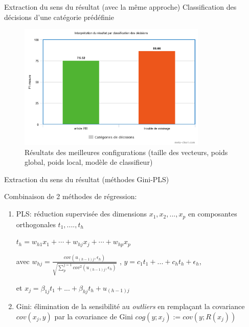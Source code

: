 \documentclass[newPxFont,pagenumber]{beamer}
\begin{document}
\begin{frame}{Extraction du sens du résultat (avec la même approche)}
Classification des décisions d'une catégorie prédéfinie
\begin{figure}
\includegraphics[width=0.8\textwidth]{classifResultat.png}
\caption{Résultats des meilleures configurations (taille des vecteurs, poids global, poids local, modèle de classifieur)}
\end{figure}
\end{frame}

\begin{frame}{Extraction du sens du résultat (méthodes Gini-PLS)}

Combinaison de 2 méthodes de régression:
\begin{enumerate}
\setlength\itemsep{1.5em}
\item PLS: réduction supervisée des dimensions $x_1, x_2, ..., x_p$ en composantes orthogonales $t_1, ...., t_h$

$t_h = w_{h1} x_1 + \cdots + w_{hj} x_j + \cdots + w_{hp} x_p$

avec $w_{hj} = \frac{cov(u_{(h-1)j}, \epsilon_h)}{\sqrt{\sum_p^{j=1} cov^2(u_{(h-1)j}, \epsilon_h)}}$
, $y=c_1 t_1 + ... + c_h t_h + \epsilon_h$,

et $x_j=\beta_{1j} t_1 + ... + \beta_{hj} t_h + u_{(h-1)j}$

\item Gini: élimination de la sensibilité au \textit{outliers} en remplaçant la covariance $cov(x_j, y)$ par la covariance de Gini $cog(y; x_j) := cov(y; R(x_j))$
\end{enumerate}

\cite{souissi2013gini}

\end{frame}
\end{document}

